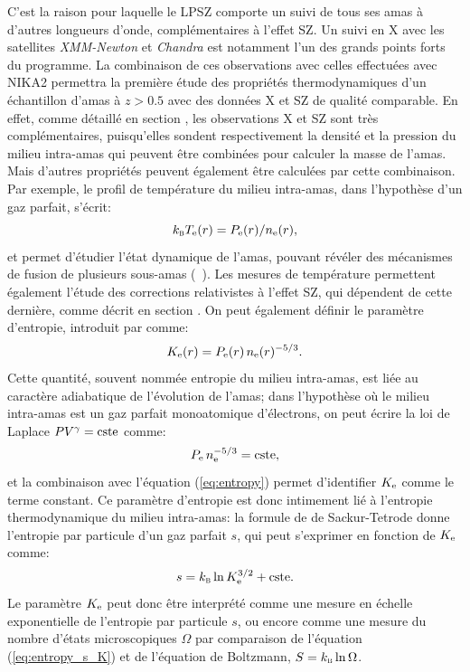 C'est la raison pour laquelle le LPSZ comporte un suivi de tous ses amas à d'autres longueurs d'onde, complémentaires à l'effet SZ.
Un suivi en X avec les satellites \textit{XMM-Newton} et \textit{Chandra} est notamment l'un des grands points forts du programme.
La combinaison de ces observations avec celles effectuées avec NIKA2 permettra la première étude des propriétés thermodynamiques d'un échantillon d'amas à $z > 0.5$ avec des données X et SZ de qualité comparable.
En effet, comme détaillé en section , les observations X et SZ sont très complémentaires, puisqu'elles sondent respectivement la densité et la pression du milieu intra-amas qui peuvent être combinées pour calculer la masse de l'amas.
Mais d'autres propriétés peuvent également être calculées par cette combinaison.
Par exemple, le profil de température du milieu intra-amas, dans l'hypothèse d'un gaz parfait, s'écrit:
\begin{equation}
    \label{eq:temperature}
    k_\textsc{b}T_{\rm e}(r) = P_{\rm e}(r) / n_{\rm e}(r),
\end{equation}
et permet d'étudier l'état dynamique de l'amas, pouvant révéler des mécanismes de fusion de plusieurs sous-amas (\eg\ \cite{adam_mapping_2017,ruppin_unveiling_2020}).
Les mesures de température permettent également l'étude des corrections relativistes à l'effet SZ, qui dépendent de cette dernière, comme décrit en section .
On peut également définir le paramètre d'entropie, introduit par  comme:
\begin{equation}
    \label{eq:entropy}
    K_{\rm e}(r) = P_{\rm e}(r) \, n_{\rm e}(r)^{-5/3}.
\end{equation}
Cette quantité, souvent nommée entropie du milieu intra-amas, est liée au caractère adiabatique de l'évolution de l'amas; dans l'hypothèse où le milieu intra-amas est un gaz parfait monoatomique d'électrons, on peut écrire la loi de Laplace $PV^\gamma = {\rm cste}$ comme:
\begin{equation}
    P_{\rm e} \, n_{\rm e}^{-5/3} = {\rm cste},
\end{equation}
et la combinaison avec l'équation (\ref{eq:entropy}) permet d'identifier $K_{\rm e}$ comme le terme constant.
Ce paramètre d'entropie est donc intimement lié à l'entropie thermodynamique du milieu intra-amas: la formule de de Sackur-Tetrode donne l'entropie par particule d'un gaz parfait $s$, qui peut s'exprimer en fonction de $K_{\rm e}$ comme:
\begin{equation}
    \label{eq:entropy_s_K}
    s = k_\textsc{b} \ln K_{\rm e}^{3/2} + {\rm cste}.
\end{equation}
Le paramètre $K_{\rm e}$ peut donc être interprété comme une mesure en échelle exponentielle de l'entropie par particule $s$, ou encore comme une mesure du nombre d'états microscopiques $\Omega$ par comparaison de l'équation (\ref{eq:entropy_s_K}) et de l'équation de Boltzmann, $S = k_\textsc{b} \ln \Omega$.

